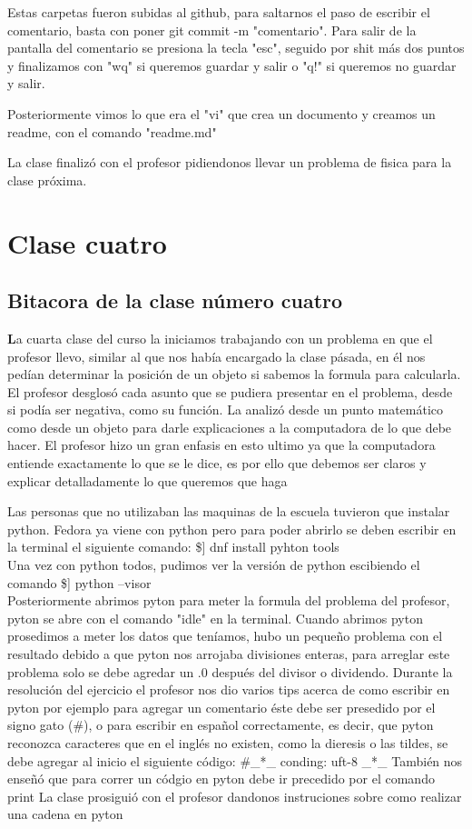 \documentclass{book}
\begin{document}
Estas carpetas fueron subidas al github, para saltarnos el paso de escribir el comentario, basta con poner git commit -m "comentario".
Para salir de la pantalla del comentario se presiona la tecla "esc", seguido por shit más dos puntos y finalizamos con "wq" si queremos guardar y salir o "q!" si queremos no guardar y salir.

Posteriormente vimos lo que era el "vi" que crea un documento y creamos un readme, con el comando "readme.md"


La clase finalizó con el profesor pidiendonos llevar un problema de fisica para la clase próxima.

\chapter{Clase cuatro}
\section{Bitacora de la clase número cuatro}
\textbf La cuarta clase del curso la iniciamos trabajando con un problema en que el profesor llevo, similar al que nos había encargado la clase pásada, en él nos pedían determinar la posición de un objeto si sabemos la formula para calcularla. El profesor desglosó cada asunto que se pudiera presentar en el problema, desde si podía ser negativa, como su función. La analizó desde un punto matemático como desde un objeto para darle explicaciones a la computadora de lo que debe hacer. El profesor hizo un gran enfasis en esto ultimo ya que la computadora entiende exactamente lo que se le dice, es por ello que debemos ser claros y explicar detalladamente lo que queremos que haga

Las personas que no utilizaban las maquinas de la escuela tuvieron que instalar python. Fedora ya viene con python pero para poder abrirlo se deben escribir en la terminal el siguiente comando: \$] dnf install pyhton tools \\ 

Una vez con python todos, pudimos ver la versión de python escibiendo el comando \$] python --visor\\
Posteriormente abrimos pyton para meter la formula del problema del profesor, pyton se abre con el comando "idle" en la terminal. Cuando abrimos pyton prosedimos a meter los datos que teníamos, hubo un pequeño problema con el resultado debido a que pyton nos arrojaba divisiones enteras, para arreglar este problema solo se debe agredar un .0 después del divisor o dividendo. 
Durante la resolución del ejercicio el profesor nos dio varios tips acerca de como escribir en pyton por ejemplo para agregar un comentario éste debe ser presedido por el signo gato (\#), o para escribir en español correctamente, es decir, que pyton reconozca caracteres que en el inglés no existen, como la dieresis o las tildes, se debe agregar al inicio el siguiente código: \#\_*\_ conding: uft-8 \_*\_
También nos enseñó que para correr un códgio en pyton debe ir precedido por el comando print
La clase prosiguió con el profesor dandonos instruciones sobre como realizar una cadena en pyton  
\end{document}
